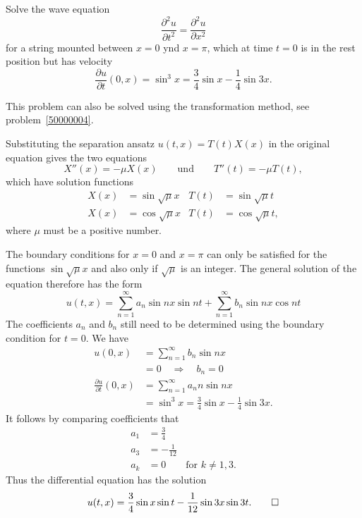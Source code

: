 Solve the wave equation
\[
\frac{\partial^2 u}{\partial t^2}=\frac{\partial^2 u}{\partial x^2}
\]
for a string mounted between $x=0$ ynd $x=\pi$, which at time $t=0$
is in the rest position but has velocity
\[
\frac{\partial u}{\partial t}(0, x)
=
\sin^3 x=\frac34\sin x-\frac14\sin 3x.
\]

\begin{hinweis}
This problem can also be solved using the transformation method, see
problem~\ref{50000004}.
\end{hinweis}

\begin{loesung}
Substituting the separation ansatz 
$u(t,x)=T(t)X(x)$ in the original equation gives the two equations
\[
X''(x)=-\mu X(x)\qquad\text{und}\qquad T''(t)=-\mu T(t),
\]
which have solution functions
\[
\begin{aligned}
X(x)&=\sin\sqrt{\mu}x & T(t)&=\sin\sqrt{\mu}t\\
X(x)&=\cos\sqrt{\mu}x & T(t)&=\cos\sqrt{\mu}t,
\end{aligned}
\]
where $\mu$ must be a positive number.

The boundary conditions for $x=0$ and $x=\pi$ can only be satisfied for
the functions $\sin\sqrt{\mu}x$ and also only if $\sqrt{\mu}$ is an
integer.
The general solution of the equation therefore has the form
\[
u(t,x)
=
\sum_{n=1}^\infty a_n\sin nx \sin nt+\sum_{n=1}^\infty b_n\sin nx\cos nt
\]
The coefficients $a_n$ and $b_n$ still need to be determined using the
boundary condition for $t=0$.
We have
\begin{align*}
u(0,x)&=
\sum_{n=1}^\infty b_n\sin nx
\\
&=0\quad\Rightarrow\quad b_n=0
\\
\frac{\partial u}{\partial t}(0,x)
&=
\sum_{n=1}^\infty a_nn\sin nx
\\
&=
\sin^3 x=\frac34\sin x-\frac14\sin 3x.
\end{align*}
It follows by comparing coefficients that
\begin{align*}
a_1&=\frac34\\
a_3&=-\frac{1}{12}\\
a_k&=0\qquad\text{for $k\ne 1,3$.}
\end{align*}
Thus the differential equation has the solution
\[
u(t,x)
= \frac34\sin x \sin t -\frac1{12}\sin 3x \sin 3t.
\qedhere
\]
\end{loesung}
